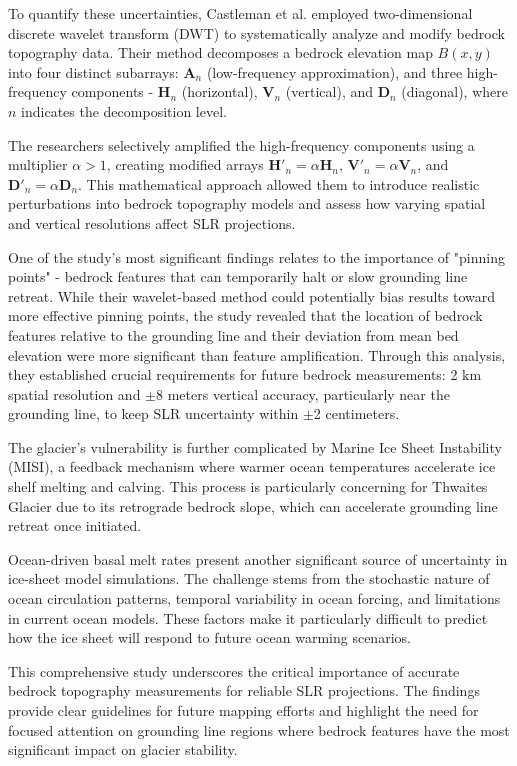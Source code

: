To quantify these uncertainties, Castleman et al.\cite{Castleman_2022} employed two-dimensional discrete wavelet transform (DWT) to systematically analyze and modify bedrock topography data. Their method decomposes a bedrock elevation map $B(x,y)$ into four distinct subarrays: $\mathbf{A}_n$ (low-frequency approximation), and three high-frequency components - $\mathbf{H}_n$ (horizontal), $\mathbf{V}_n$ (vertical), and $\mathbf{D}_n$ (diagonal), where $n$ indicates the decomposition level. 

The researchers selectively amplified the high-frequency components using a multiplier $\alpha > 1$, creating modified arrays $\mathbf{H}'_n = \alpha\mathbf{H}_n$, $\mathbf{V}'_n = \alpha\mathbf{V}_n$, and $\mathbf{D}'_n = \alpha\mathbf{D}_n$. This mathematical approach allowed them to introduce realistic perturbations into bedrock topography models and assess how varying spatial and vertical resolutions affect SLR projections.

One of the study's most significant findings relates to the importance of "pinning points" - bedrock features that can temporarily halt or slow grounding line retreat. While their wavelet-based method could potentially bias results toward more effective pinning points, the study revealed that the location of bedrock features relative to the grounding line and their deviation from mean bed elevation were more significant than feature amplification\cite{Castleman_2022}. Through this analysis, they established crucial requirements for future bedrock measurements: 2 km spatial resolution and $\pm$8 meters vertical accuracy, particularly near the grounding line, to keep SLR uncertainty within $\pm$2 centimeters.

The glacier's vulnerability is further complicated by Marine Ice Sheet Instability (MISI), a feedback mechanism where warmer ocean temperatures accelerate ice shelf melting and calving. This process is particularly concerning for Thwaites Glacier due to its retrograde bedrock slope, which can accelerate grounding line retreat once initiated.

Ocean-driven basal melt rates present another significant source of uncertainty in ice-sheet model simulations. The challenge stems from the stochastic nature of ocean circulation patterns, temporal variability in ocean forcing, and limitations in current ocean models. These factors make it particularly difficult to predict how the ice sheet will respond to future ocean warming scenarios.

This comprehensive study underscores the critical importance of accurate bedrock topography measurements for reliable SLR projections. The findings provide clear guidelines for future mapping efforts and highlight the need for focused attention on grounding line regions where bedrock features have the most significant impact on glacier stability.

